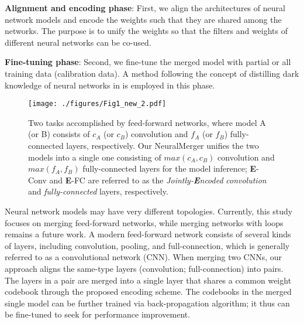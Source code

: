\documentclass{article}
\begin{document}
	\noindent \textbf{Alignment and encoding phase}: First, we align the architectures of neural network models and encode the weights
	such that they are shared among the networks.
	The purpose is to unify the weights so that the filters and weights of different neural networks can be co-used.
	
	\noindent \textbf{Fine-tuning phase}: Second, we fine-tune the merged model with partial or all training data (calibration data). A method following the concept of distilling dark knowledge of neural networks in \cite{HintonDistilling14} is employed in this phase.
	
	\begin{figure}[t]
		\begin{center}
			\texttt{[image: ./figures/Fig1\_new\_2.pdf]}
		\end{center}
		\vspace{-0.1cm}
		\caption{Two tasks accomplished by feed-forward networks, where model A (or B) consists of $c_A$ (or $c_B$) convolution and $f_A$ (or $f_B$) fully-connected layers, respectively. Our NeuralMerger unifies the two models into a single one consisting of $max(c_A, c_B)$ convolution and $max(f_A, f_B)$ fully-connected layers for the model inference; \textbf{E}-Conv and \textbf{E}-FC are referred to as the \emph{Jointly-\textbf{E}ncoded} \emph{convolution} and \emph{fully-connected} layers, respectively.%
		}
		\label{fig:concept}
	\end{figure}
	
	Neural network models may have very different topologies.
	Currently, this study focuses on merging feed-forward networks, while merging networks with loops remains a future work.
	A modern feed-forward network consists of several kinds of layers, including convolution, pooling, and full-connection, which is generally referred to as a convolutional network (CNN).
	When merging two CNNs, our approach aligns the same-type layers (convolution; full-connection) into pairs.
	The layers in a pair are merged into a single layer that shares a common weight codebook through the proposed encoding scheme.
	The codebooks in the merged single model can be further trained via back-propagation algorithm; it thus can be fine-tuned to seek for performance improvement.
	
\end{document}
